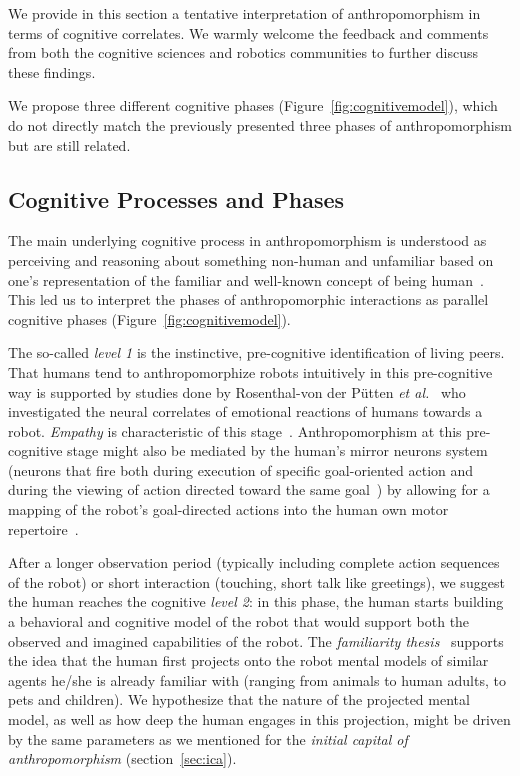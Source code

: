 \documentclass{frontiersSCNS} %
\begin{document}
We provide in this section a tentative interpretation of anthropomorphism in
terms of cognitive correlates. We warmly welcome the feedback and
comments from both the cognitive sciences and robotics communities to further
discuss these findings.

We propose three different cognitive phases (Figure~\ref{fig:cognitivemodel}),
which do not directly match the previously presented three phases of
anthropomorphism but are still related.


\subsection{Cognitive Processes and Phases}

The main underlying cognitive process in anthropomorphism is understood as
perceiving and reasoning about something non-human and unfamiliar based on one's
representation of the familiar and well-known concept of being
human~\cite{epley_when_2008}. This led us to interpret the phases of
anthropomorphic interactions as parallel cognitive phases
(Figure~\ref{fig:cognitivemodel}).

The so-called \emph{level 1} is the instinctive, pre-cognitive identification of
living peers. That humans tend to anthropomorphize robots intuitively in this
pre-cognitive way
is supported by studies done by Rosenthal-von der Pütten
\textit{et al.}~\cite{rosenthal-vonderputten_experimental_2013} who investigated
the neural correlates of emotional reactions of humans towards a robot. {\it
Empathy} is characteristic of this stage~\cite{rosenthalvonderPutten2013neural}.
Anthropomorphism at this pre-cognitive stage might also be mediated by the
human's mirror neurons system (neurons that fire both during execution of
specific goal-oriented action and during the viewing of action directed toward
the same goal~\cite{Rizzolatti1996, Kilner2009}) by allowing for a mapping of
the robot's goal-directed actions into the human own motor
repertoire~\cite{Gallese1998, Wolpert2003, cullen2013individual}.

After a longer observation period (typically including complete action sequences
of the robot) or short interaction (touching, short talk like greetings), we
suggest the human reaches the cognitive \emph{level 2}: in this phase, the human
starts building a behavioral and cognitive model of the robot that would support
both the observed and imagined capabilities of the robot.  The \emph{familiarity
thesis}~\cite{hegel_understanding_2008} supports the idea that the human
first projects onto the robot mental models of similar agents he/she is already
familiar with (ranging from animals to human adults, to pets and children). We 
hypothesize that the nature of the projected mental
model, as well as how deep the human engages in this projection, might be
driven by the same parameters as we mentioned for the \emph{initial capital of
anthropomorphism} (section~\ref{sec:ica}).
\end{document}
